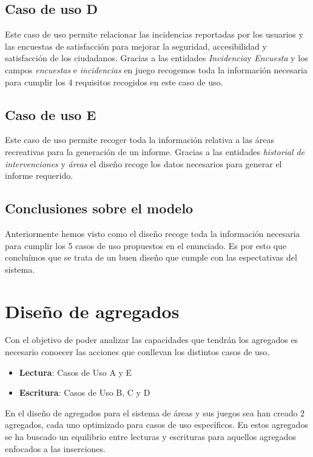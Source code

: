\documentclass[]{article}
\begin{document}
\subsection{Caso de uso D}
\label{subsec:casoD}
Este caso de uso permite relacionar las incidencias reportadas por los usuarios y las encuestas de satisfacción para mejorar la seguridad, accesibilidad y satisfacción de los ciudadanos. Gracias a las entidades \textit{Incidencia}y \textit{Encuesta} y los campos \textit{encuestas} e \textit{incidencias} en juego recogemos toda la información necesaria para cumplir los 4 requisitos recogidos en este caso de uso.

\subsection{Caso de uso E}
\label{subsec:casoE}
Este caso de uso permite recoger toda la información relativa a las áreas recreativas para la generación de un informe. Gracias a las entidades \textit{historial de intervenciones} y \textit{áreas} el diseño recoge los datos necesarios para generar el informe requerido.

\subsection{Conclusiones sobre el modelo}
\label{subsec:conclusiones-modelo}
Anteriormente hemos visto como el diseño recoge toda la información necesaria para cumplir los 5 casos de uso propuestos en el enunciado. Es por esto que concluímos que se trata de un buen diseño que cumple con las espectativas del sistema.

\newpage
\section{Diseño de agregados}
\label{sec:agregados}
Con el objetivo de poder analizar las capacidades que tendrán los agregados es necesario conoecer las acciones que conllevan los distintos casos de uso.
\begin{itemize}
    \item \textbf{Lectura}: Casos de Uso A y E
    \item \textbf{Escritura}: Casos de Uso B, C y D
\end{itemize}

En el diseño de agregados para el sistema de áreas y sus juegos sea han creado 2 agregados, cada uno optimizado para casos de uso específicos. En estos agregados se ha buscado un equilibrio entre lecturas y escrituras para aquellos agregados enfocados a las inserciones.
\end{document}
